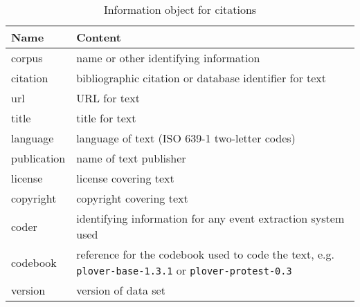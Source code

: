 \documentclass[11pt]{report}
\begin{document}
\begin{table}[htp]
\caption{Information object for citations }
\begin{center}
\begin{tabular}{|l|l|}
\hline
Name & Content \\
\hline
corpus & name or other identifying information\\
citation &  bibliographic citation or database identifier for text\\
url &  URL for text\\
title &  title for text\\
language & language of text (ISO 639-1 two-letter codes)\\
publication & name of text publisher\\
license & license covering text\\
copyright & copyright covering text\\
coder &  identifying information for any event extraction system used\\
codebook &  reference for the codebook used to code the text, e.g. \texttt{plover-base-1.3.1} or \texttt{plover-protest-0.3}\\
version &  version of data set\\
\hline
\end{tabular}
\end{center}
\label{tab:citeinfo}
\end{table}%
\end{document}
